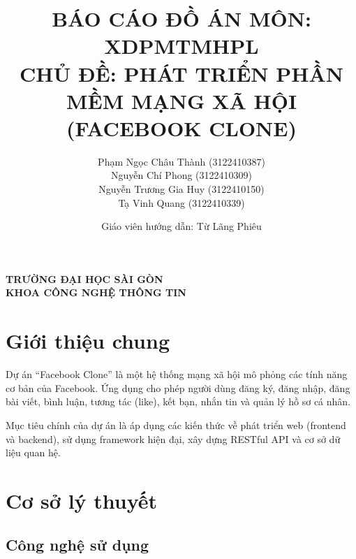 \documentclass[a4paper,12pt]{article}
\title{BÁO CÁO ĐỒ ÁN MÔN: XDPMTMHPL \\ CHỦ ĐỀ: PHÁT TRIỂN PHẦN MỀM MẠNG XÃ HỘI (FACEBOOK CLONE)}
\author{
	Phạm Ngọc Châu Thành (3122410387) \\
	Nguyễn Chí Phong (3122410309) \\
	Nguyễn Trương Gia Huy (3122410150) \\
	Tạ Vinh Quang (3122410339)
}
\date{Giáo viên hướng dẫn: Từ Lãng Phiêu}
\begin{document}
	
	\maketitle
	\begin{center}
		\textbf{TRƯỜNG ĐẠI HỌC SÀI GÒN} \\
		\textbf{KHOA CÔNG NGHỆ THÔNG TIN}
	\end{center}
	\vspace{1cm}
	
	\tableofcontents
	\newpage
	
	\section{Giới thiệu chung}
	Dự án ``Facebook Clone'' là một hệ thống mạng xã hội mô phỏng các tính năng cơ bản của Facebook. Ứng dụng cho phép người dùng đăng ký, đăng nhập, đăng bài viết, bình luận, tương tác (like), kết bạn, nhắn tin và quản lý hồ sơ cá nhân.
	
	Mục tiêu chính của dự án là áp dụng các kiến thức về phát triển web (frontend và backend), sử dụng framework hiện đại, xây dựng RESTful API và cơ sở dữ liệu quan hệ.
	
	\section{Cơ sở lý thuyết}
	
	\subsection{Công nghệ sử dụng}
	
\end{document}
